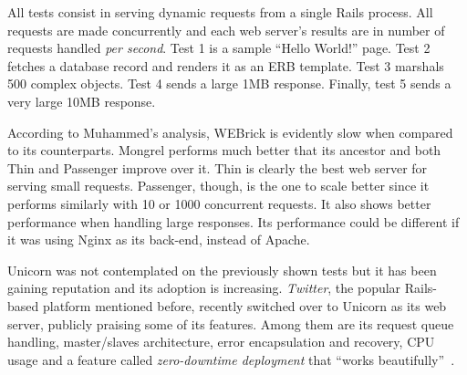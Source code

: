 All tests consist in serving dynamic requests from a single Rails process. All requests are made concurrently and each web server's results are in number of requests handled \textit{per second}. Test 1 is a sample ``Hello World!'' page. Test 2 fetches a database record and renders it as an ERB template. Test 3 marshals 500 complex objects. Test 4 sends a large 1MB response. Finally, test 5 sends a very large 10MB response.

According to Muhammed's analysis, WEBrick is evidently slow when compared to its counterparts. Mongrel performs much better that its ancestor and both Thin and Passenger improve over it. Thin is clearly the best web server for serving small requests. Passenger, though, is the one to scale better since it performs similarly with 10 or 1000 concurrent requests. It also shows better performance when handling large responses. Its performance could be different if it was using Nginx as its back-end, instead of Apache.

Unicorn was not contemplated on the previously shown tests but it has been gaining reputation and its adoption is increasing. \textit{Twitter}, the popular Rails-based platform mentioned before, recently switched over to Unicorn as its web server, publicly praising some of its features. Among them are its request queue handling, master/slaves architecture, error encapsulation and recovery, CPU usage and a feature called \textit{zero-downtime deployment} that ``works beautifully''~\cite{twitter_unicorn}.

